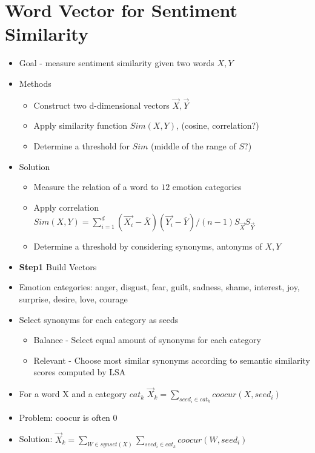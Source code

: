 \documentclass[compress]{beamer}
\begin{document}
\section[Sentiment Similarity]{Word Vector for Sentiment Similarity}
\begin{frame}[allowframebreaks]{\secname}
\begin{itemize}
\item Goal - measure sentiment similarity given two words $X, Y$
\item Methods
\begin{itemize}
\item Construct two d-dimensional vectors $\vec{X}, \vec{Y}$
\item Apply similarity function $Sim(X, Y)$, (cosine, correlation?)
\item Determine a threshold for $Sim$ (middle of the range of $S$?)
\end{itemize}
\item Solution
\begin{itemize}
\item Measure the relation of a word to  $12$ emotion categories
\item Apply correlation
$Sim(X,Y)=\sum\limits_{i=1}^d (\vec{X_i}-\bar{X})(\vec{Y_i}-\bar{Y})/(n-1)S_{\vec{X}} S_{\vec{Y}}$
\item Determine a threshold by considering synonyms, antonyms of $X, Y$
\end{itemize}
\end{itemize}

\framebreak

\begin{itemize}
\item \textbf{Step1} Build Vectors
\item Emotion categories:  anger, disgust, fear, guilt, sadness, shame, interest, joy, surprise, desire, love, courage
\item Select synonyms for each category as seeds
\begin{itemize}
\item Balance - Select equal amount of synonyms for each category
\item Relevant - Choose most similar synonyms according to semantic similarity scores computed by LSA
\end{itemize}
\item For a word X and a category $cat_k$ $\vec{X}_k=\sum\limits_{seed_i\in cat_k}coocur(X,seed_i)$
\item Problem: coocur is often $0$
\item Solution: $\vec{X}_k=\sum\limits_{W\in synset(X)}\sum\limits_{seed_i\in cat_k}coocur(W,seed_i)$
\end{itemize}


\end{frame}
\end{document}
